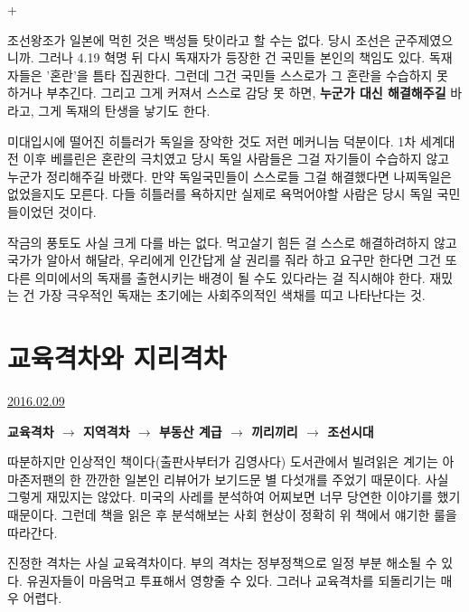 +
\vspace{5mm}

조선왕조가 일본에 먹힌 것은 백성들 탓이라고 할 수는 없다. 당시 조선은 군주제였으니까.
그러나 4.19 혁명 뒤 다시 독재자가 등장한 건 국민들 본인의 책임도 있다.
독재자들은 '혼란'을 틈타 집권한다. 그런데 그건 국민들 스스로가 그 혼란을 수습하지 못 하거나 부추긴다.
그리고 그게 커져서 스스로 감당 못 하면, \textbf{누군가 대신 해결해주길} 바라고, 그게 독재의 탄생을 낳기도 한다.
\vspace{5mm}

미대입시에 떨어진 히틀러가 독일을 장악한 것도 저런 메커니늠 덕분이다.
1차 세계대전 이후 베를린은 혼란의 극치였고 당시 독일 사람들은 그걸 자기들이 수습하지 않고 누군가 정리해주길 바랬다.
만약 독일국민들이 스스로들 그걸 해결했다면 나찌독일은 없었을지도 모른다.
다들 히틀러를 욕하지만 실제로 욕먹어야할 사람은 당시 독일 국민들이었던 것이다.
\vspace{5mm}

작금의 풍토도 사실 크게 다를 바는 없다.
먹고살기 힘든 걸 스스로 해결하려하지 않고 국가가 알아서 해달라, 우리에게 인간답게 살 권리를 줘라 하고 요구만 한다면
그건 또 다른 의미에서의 독재를 출현시키는 배경이 될 수도 있다라는 걸 직시해야 한다.
재밌는 건 가장 극우적인 독재는 초기에는 사회주의적인 색채를 띠고 나타난다는 것.
\vspace{5mm}







\section{교육격차와 지리격차}
\href{https://www.kockoc.com/Apoc/628985}{2016.02.09}

\vspace{5mm}

\textbf{교육격차 $\rightarrow$ 지역격차 $\rightarrow$ 부동산 계급 $\rightarrow$ 끼리끼리 $\rightarrow$ 조선시대}
\vspace{5mm}

따분하지만 인상적인 책이다(출판사부터가 김영사다)
도서관에서 빌려읽은 계기는 아마존저팬의 한 깐깐한 일본인 리뷰어가 보기드문 별 다섯개를 주었기 때문이다.
사실 그렇게 재밌지는 않았다. 미국의 사레를 분석하여 어찌보면 너무 당연한 이야기를 했기 때문이다.
그런데 책을 읽은 후 분석해보는 사회 현상이 정확히 위 책에서 얘기한 룰을 따라간다.
\vspace{5mm}

진정한 격차는 사실 교육격차이다.
부의 격차는 정부정책으로 일정 부분 해소될 수 있다. 유권자들이 마음먹고 투표해서 영향줄 수 있다.
그러나 교육격차를 되돌리기는 매우 어렵다.
\vspace{5mm}

